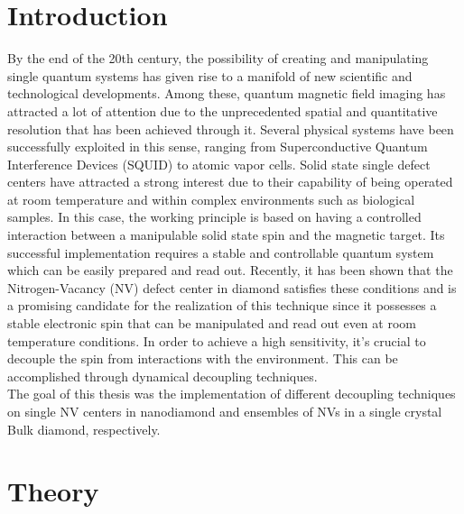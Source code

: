 \documentclass[12pt,a4paper]{article}
\begin{document}

 

\maketitle

\thispagestyle{empty}
\newpage

\tableofcontents
\thispagestyle{empty}
\newpage
{}

\section{Introduction}
By the end of the 20th century, the possibility of creating and manipulating single quantum systems has given rise to a manifold of new scientific and technological developments. Among these, quantum magnetic field imaging has attracted a lot of attention due to the unprecedented spatial and quantitative resolution that has been achieved through it. Several physical systems have been successfully exploited in this sense, ranging from Superconductive Quantum Interference Devices (SQUID)\cite{squid} to atomic vapor cells\cite{avc}. Solid state single defect centers have attracted a strong interest due to their capability of being operated at room temperature and within complex environments such as biological samples. In this case, the working principle is based on having a controlled interaction between a manipulable solid state spin and the magnetic target. Its successful implementation requires a stable and controllable quantum system which can be easily prepared and read out. Recently, it has been shown that the Nitrogen-Vacancy (NV) defect center in diamond satisfies these conditions and is a promising candidate for the realization of this technique since it possesses a stable electronic spin that can be manipulated and read out even at room temperature conditions\cite{nvref}. In order to achieve a high sensitivity, it's crucial to decouple the spin from interactions with the environment. This can be accomplished through dynamical decoupling techniques.\\
The goal of this thesis was the implementation of different decoupling techniques on single NV centers in nanodiamond and ensembles of NVs in a single crystal Bulk diamond, respectively.

\section{Theory}
\end{document}

